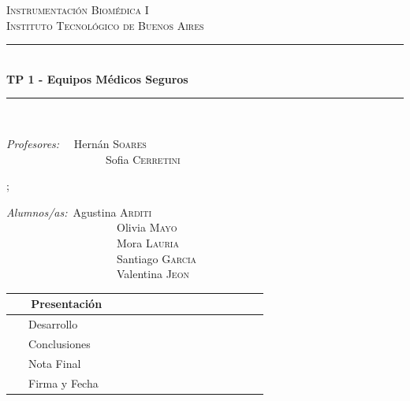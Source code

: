 \documentclass[10pt]{article}
\newcommand{\HRule}{\rule{\linewidth}{0.5mm}}
\begin{document}
\begin{center}


\textsc{\LARGE Instrumentación Biomédica I}\\[0.2cm]
\textsc{\Large Instituto Tecnológico de Buenos Aires}\\[0.2cm]

\HRule\\[0.2cm]
{ \huge \bfseries  TP 1 - Equipos Médicos Seguros \\[0.2cm] }
\HRule\\[1cm]

\begin{multicols}{2}

{\raggedright{}
\large
\emph{Profesores:} \ \  Hernán   \textsc{Soares}\\

\ \ \ \ \ \ \ \ \ \ \ \ \ \ \ \ \ \  Sofia \textsc{Cerretini} \\
}

\columnbreak;
{\raggedright{}
\large
\emph{Alumnos/as:}\  Agustina  \textsc{Arditi} \\
\ \ \ \ \ \ \ \ \ \ \ \ \ \ \ \ \ \ \ \ Olivia  \textsc{Mayo}\\
\  \ \ \ \ \ \ \ \ \ \ \ \ \ \ \ \ \ \ \ Mora  \textsc{Lauria}\\
\ \ \ \ \ \ \ \ \ \ \ \ \ \ \ \ \ \ \ \ Santiago \textsc{Garcia} \\
\ \ \ \ \ \ \ \ \ \ \ \ \ \ \ \ \ \ \ \ Valentina \textsc{Jeon} \\
}
\end{multicols}

\vspace{0.5cm}

\begin{adjustbox}{max width=\textwidth}

\tabulinesep=1.8mm

  \begin{tabu}{|  l | c |}
    \hline
     \ \ \ Presentación  &       \ \ \  \ \ \  \ \ \   \ \ \ \ \ \  \\ \hline
     \ \ \ Desarrollo &  \\ \hline
     \ \ \ Conclusiones &   \\ \hline
    \ \ \  Nota Final &  \\ \hline \hline
     \ \ \  Firma y Fecha  \ \ \ \ \ \ \ \ \ &   \\
    \hline
  \end{tabu}
\end{adjustbox}

\end{center}
\end{document}
